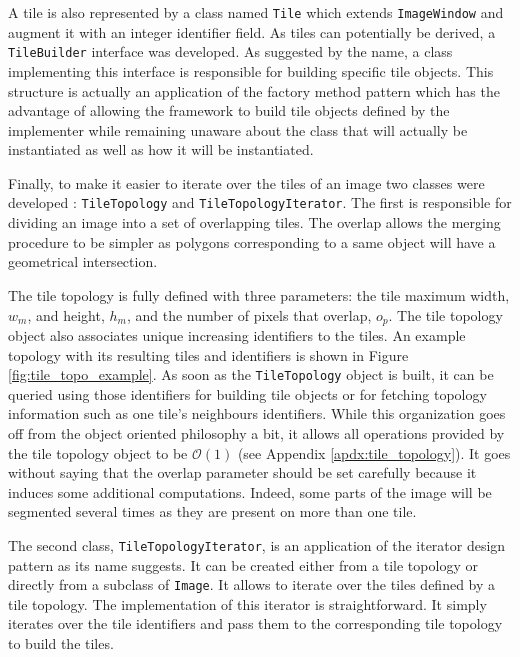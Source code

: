 A tile is also represented by a class named \texttt{Tile} which extends \texttt{ImageWindow} and augment it with an integer identifier field. As tiles can potentially be derived, a \texttt{TileBuilder} interface was developed. As suggested by the name, a class implementing this interface is responsible for building specific tile objects. This structure is actually an application of the factory method pattern which has the advantage of allowing the framework to build tile objects defined by the implementer while remaining unaware about the class that will actually be instantiated as well as how it will be instantiated.

Finally, to make it easier to iterate over the tiles of an image two classes were developed : \texttt{TileTopology} and \texttt{TileTopologyIterator}. The first is responsible for dividing an image into a set of overlapping tiles. The overlap allows the merging procedure to be simpler as polygons corresponding to a same object will have a geometrical intersection. 

The tile topology is fully defined with three parameters: the tile maximum width, $w_m$, and height, $h_m$, and the number of pixels that overlap, $o_p$. The tile topology object also associates unique increasing identifiers to the tiles. An example topology with its resulting tiles and identifiers is shown in Figure \ref{fig:tile_topo_example}. As soon as the \texttt{TileTopology} object is built, it can be queried using those identifiers for building tile objects or for fetching topology information such as one tile's neighbours identifiers. While this organization goes off from the object oriented philosophy a bit, it allows all operations provided by the tile topology object to be $\mathcal{O}(1)$ (see Appendix \ref{apdx:tile_topology}). It goes without saying that the overlap parameter should be set carefully because it induces some additional computations. Indeed, some parts of the image will be segmented several times as they are present on more than one tile. 

The second class, \texttt{TileTopologyIterator}, is an application of the iterator design pattern as its name suggests. It can be created either from a tile topology or directly from a subclass of \texttt{Image}. It allows to iterate over the tiles defined by a tile topology. The implementation of this iterator is straightforward. It simply iterates over the tile identifiers and pass them to the corresponding tile topology to build the tiles. 

